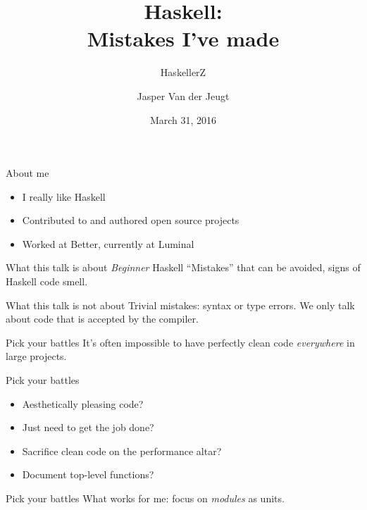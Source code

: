 \documentclass[20pt]{beamer}
\begin{document}
\title{Haskell:\\
Mistakes I've made}
\subtitle{HaskellerZ}
\author{Jasper Van der Jeugt}
\date{March 31, 2016}

\begin{frame}[plain]
    \titlepage
\end{frame}

\begin{frame}{About me}
    \begin{itemize}
    \item I really like Haskell
    \item Contributed to and authored open source projects
    \item Worked at Better, currently at Luminal
    \end{itemize}
\end{frame}

\begin{frame}{What this talk is about}
    \emph{Beginner} Haskell ``Mistakes'' that can be avoided, signs of Haskell
    code smell.
\end{frame}

\begin{frame}{What this talk is not about}
    Trivial mistakes: syntax or type errors. We only talk about code that is
    accepted by the compiler.
\end{frame}


\begin{frame}{Pick your battles}
    It's often impossible to have perfectly clean code \emph{everywhere} in
    large projects.
\end{frame}

\begin{frame}{Pick your battles}
    \begin{itemize}
    \item Aesthetically pleasing code?
    \item Just need to get the job done?
    \item Sacrifice clean code on the performance altar?
    \item Document top-level functions?
    \end{itemize}
\end{frame}

\begin{frame}{Pick your battles}
    What works for me: focus on \emph{modules} as units.
\end{frame}
\end{document}
